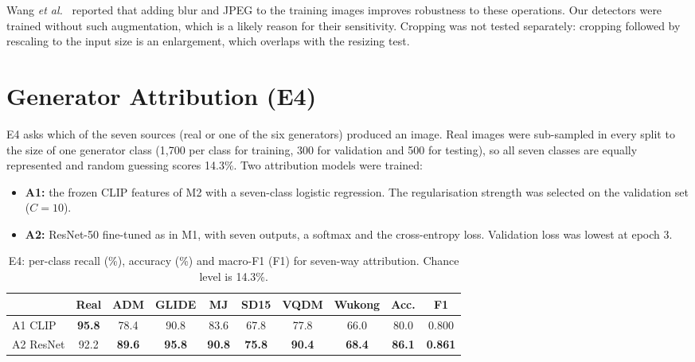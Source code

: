 \documentclass{mnnit}
\begin{document}
Wang \emph{et al.}~\cite{wang2020cnn} reported that adding blur and JPEG
to the training images improves robustness to these operations. Our
detectors were trained without such augmentation, which is a likely
reason for their sensitivity. Cropping was not tested separately:
cropping followed by rescaling to the input size is an enlargement,
which overlaps with the resizing test.

\section{Generator Attribution (E4)}
E4 asks which of the seven sources (real or one of the six generators)
produced an image. Real images were sub-sampled in every split to the
size of one generator class (1{,}700 per class for training, 300 for
validation and 500 for testing), so all seven classes are equally
represented and random guessing scores 14.3\%. Two attribution models
were trained:
\begin{itemize}
  \item \textbf{A1:} the frozen CLIP features of M2 with a seven-class
        logistic regression. The regularisation strength was selected on
        the validation set ($C = 10$).
  \item \textbf{A2:} \mbox{ResNet-50} fine-tuned as in M1, with seven outputs,
        a softmax and the cross-entropy loss. Validation loss was lowest
        at epoch 3.
\end{itemize}

\begin{table}[htbp]
\centering
\caption[E4: per-class recall (\%), accuracy (\%) and macro-F1 (F1) for seven-way attribution]{E4: per-class recall (\%), accuracy (\%) and macro-F1 (F1) for seven-way attribution. Chance level is 14.3\%.}
\label{tab:e4}
\footnotesize
\setlength{\tabcolsep}{4pt}
\begin{tabular}{lccccccc|cc}
\toprule
 & \textbf{Real} & \textbf{ADM} & \textbf{GLIDE} & \textbf{MJ} & \textbf{SD15} & \textbf{VQDM} & \textbf{Wukong} & \textbf{Acc.} & \textbf{F1}\\
\midrule
A1 CLIP & \textbf{95.8} & 78.4 & 90.8 & 83.6 & 67.8 & 77.8 & 66.0 & 80.0 & 0.800\\
A2 ResNet & 92.2 & \textbf{89.6} & \textbf{95.8} & \textbf{90.8} & \textbf{75.8} & \textbf{90.4} & \textbf{68.4} & \textbf{86.1} & \textbf{0.861}\\
\bottomrule
\end{tabular}
\end{table}
\end{document}
